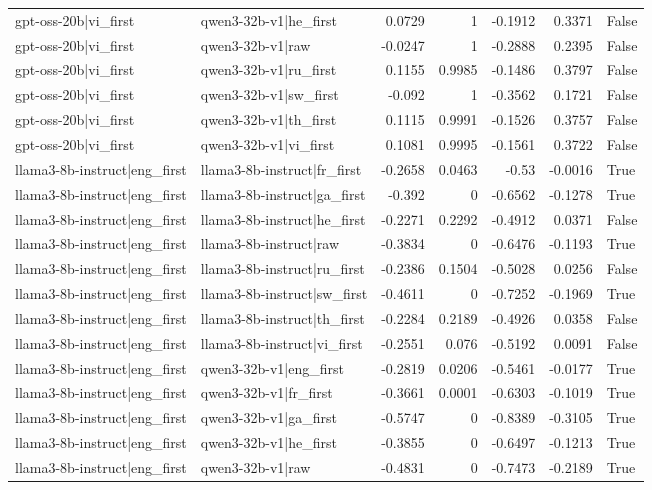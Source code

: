 \begin{table}
\begin{tabular}{l l r r r r l}
gpt-oss-20b|vi_first & qwen3-32b-v1|he_first & 0.0729 & 1 & -0.1912 & 0.3371 & False \\
gpt-oss-20b|vi_first & qwen3-32b-v1|raw & -0.0247 & 1 & -0.2888 & 0.2395 & False \\
gpt-oss-20b|vi_first & qwen3-32b-v1|ru_first & 0.1155 & 0.9985 & -0.1486 & 0.3797 & False \\
gpt-oss-20b|vi_first & qwen3-32b-v1|sw_first & -0.092 & 1 & -0.3562 & 0.1721 & False \\
gpt-oss-20b|vi_first & qwen3-32b-v1|th_first & 0.1115 & 0.9991 & -0.1526 & 0.3757 & False \\
gpt-oss-20b|vi_first & qwen3-32b-v1|vi_first & 0.1081 & 0.9995 & -0.1561 & 0.3722 & False \\
llama3-8b-instruct|eng_first & llama3-8b-instruct|fr_first & -0.2658 & 0.0463 & -0.53 & -0.0016 & True \\
llama3-8b-instruct|eng_first & llama3-8b-instruct|ga_first & -0.392 & 0 & -0.6562 & -0.1278 & True \\
llama3-8b-instruct|eng_first & llama3-8b-instruct|he_first & -0.2271 & 0.2292 & -0.4912 & 0.0371 & False \\
llama3-8b-instruct|eng_first & llama3-8b-instruct|raw & -0.3834 & 0 & -0.6476 & -0.1193 & True \\
llama3-8b-instruct|eng_first & llama3-8b-instruct|ru_first & -0.2386 & 0.1504 & -0.5028 & 0.0256 & False \\
llama3-8b-instruct|eng_first & llama3-8b-instruct|sw_first & -0.4611 & 0 & -0.7252 & -0.1969 & True \\
llama3-8b-instruct|eng_first & llama3-8b-instruct|th_first & -0.2284 & 0.2189 & -0.4926 & 0.0358 & False \\
llama3-8b-instruct|eng_first & llama3-8b-instruct|vi_first & -0.2551 & 0.076 & -0.5192 & 0.0091 & False \\
llama3-8b-instruct|eng_first & qwen3-32b-v1|eng_first & -0.2819 & 0.0206 & -0.5461 & -0.0177 & True \\
llama3-8b-instruct|eng_first & qwen3-32b-v1|fr_first & -0.3661 & 0.0001 & -0.6303 & -0.1019 & True \\
llama3-8b-instruct|eng_first & qwen3-32b-v1|ga_first & -0.5747 & 0 & -0.8389 & -0.3105 & True \\
llama3-8b-instruct|eng_first & qwen3-32b-v1|he_first & -0.3855 & 0 & -0.6497 & -0.1213 & True \\
llama3-8b-instruct|eng_first & qwen3-32b-v1|raw & -0.4831 & 0 & -0.7473 & -0.2189 & True \\

\end{tabular}
\end{table}
